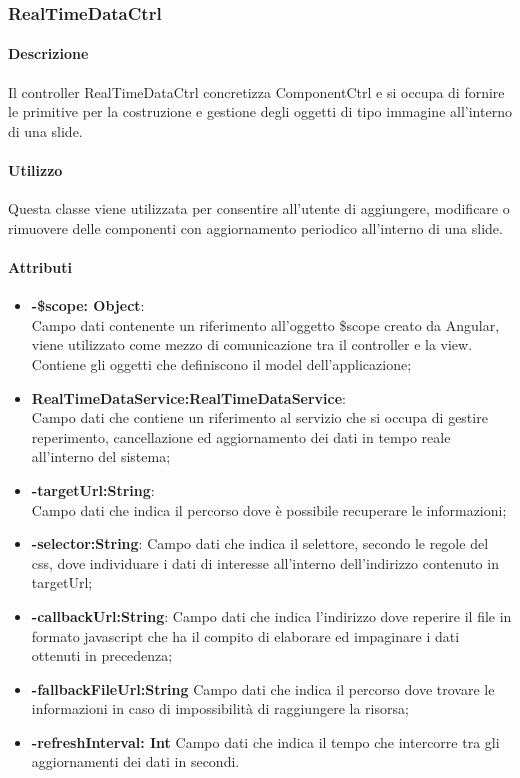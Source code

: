 \newpage
\subsubsection{RealTimeDataCtrl}
   \paragraph{Descrizione}
	Il controller RealTimeDataCtrl concretizza ComponentCtrl e si occupa di fornire le primitive per la costruzione e gestione degli oggetti di tipo immagine all'interno di una slide.
		
	\paragraph{Utilizzo}
	Questa classe viene utilizzata per consentire all'utente di aggiungere, modificare o rimuovere delle componenti con aggiornamento periodico all'interno di una slide.
	
	\paragraph{Attributi}
	\begin{itemize}
		\item \textbf{-\$scope: Object}:\\
			Campo dati contenente un riferimento all'oggetto \$scope creato da Angular, viene utilizzato come mezzo di comunicazione tra il controller e la view. Contiene gli oggetti che definiscono il model dell'applicazione;
		\item \textbf{RealTimeDataService:RealTimeDataService}:\\
			Campo dati che contiene un riferimento al servizio che si occupa di gestire reperimento, cancellazione ed aggiornamento dei dati in tempo reale all'interno del sistema;
		\item \textbf{-targetUrl:String}:\\
			Campo dati che indica il percorso dove è possibile recuperare le informazioni;
		\item \textbf{-selector:String}:
			Campo dati che indica il selettore, secondo le regole del css, dove individuare i dati di interesse all'interno dell'indirizzo contenuto in targetUrl;
		\item \textbf{-callbackUrl:String}:
			Campo dati che indica l'indirizzo dove reperire il file in formato javascript che ha il compito di elaborare ed impaginare i dati ottenuti in precedenza;
		\item \textbf{-fallbackFileUrl:String}
			Campo dati che indica il percorso dove trovare le informazioni in caso di impossibilità di raggiungere la risorsa;
		\item \textbf{-refreshInterval: Int}
			Campo dati che indica il tempo che intercorre tra gli aggiornamenti dei dati in secondi.
			
	\end{itemize}
	
